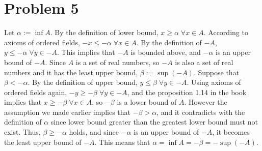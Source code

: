 \documentclass{scrartcl}
\begin{document}
\section{Problem 5}
Let \(\alpha := \inf A\). By the definition of lower bound, \(x \geq \alpha \; \forall x \in A\). According to axioms of ordered fields, \(-x \leq -\alpha \; \forall x \in A\). By the definition of \(-A\), \(y \leq -\alpha \; \forall y \in -A\). This implies that \(-A\) is bounded above, and \(-\alpha\) is an upper bound of \(-A\). Since \(A\) is a set of real numbers, so \(-A\) is also a set of real numbers and it has the least upper bound, \(\beta := \sup (-A)\). Suppose that \(\beta < -\alpha\). By the definition of upper bound, \(y \leq \beta \; \forall y \in -A\). Using axioms of ordered fields again, \(-y \geq -\beta \; \forall y \in -A\), and the proposition 1.14 in the book implies that \(x \geq -\beta \; \forall x \in A\), so \(-\beta\) is a lower bound of \(A\). However the assumption we made earlier implies that \(-\beta > \alpha\), and it contradicts with the definition of \(\alpha\) since lower bound greater than the greatest lower bound must not exist. Thus, \(\beta \geq -\alpha\) holds, and since \(-\alpha\) is an upper bound of \(-A\), it becomes the least upper bound of \(-A\). This means that \(\alpha = \inf A = -\beta = -\sup(-A)\).
\end{document}
